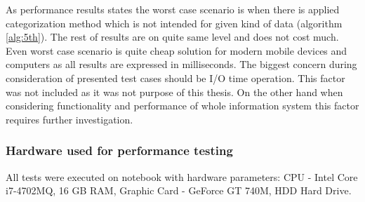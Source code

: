 As performance results states the worst case scenario is when there is applied categorization method which is not intended for given kind of data (algorithm \ref{alg:5th}). The rest of results are on quite same level and does not cost much. Even worst case scenario is quite cheap solution for modern mobile devices and computers as all results are expressed in milliseconds. The biggest concern during consideration of presented test cases should be I/O time operation. This factor was not included as it was not purpose of this thesis. On the other hand when considering functionality and performance of whole information system this factor requires further investigation.

\subsubsection{Hardware used for performance testing}
All tests were executed on notebook with hardware parameters: CPU - Intel Core i7-4702MQ, 16 GB RAM, Graphic Card - GeForce GT 740M, HDD Hard Drive.
    
